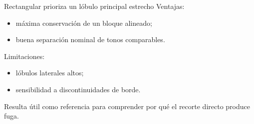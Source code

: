\documentclass[
  ignorenonframetext,
  aspectratio=169,
  spanish,
]{beamer}
\providecommand{\tightlist}{%
  \setlength{\itemsep}{0pt}\setlength{\parskip}{0pt}}
\begin{document}
\begin{frame}{Rectangular prioriza un lóbulo principal estrecho}
  \protect{}\label{rectangular-prioriza-un-luxf3bulo-principal-estrecho}
  Ventajas:

  \begin{itemize}
    \tightlist
    \item
          máxima conservación de un bloque alineado;
    \item
          buena separación nominal de tonos comparables.
  \end{itemize}

  Limitaciones:

  \begin{itemize}
    \tightlist
    \item
          lóbulos laterales altos;
    \item
          sensibilidad a discontinuidades de borde.
  \end{itemize}

  \begin{tcolorbox}[enhanced jigsaw, arc=.35mm, bottomrule=.15mm, bottomtitle=1mm, breakable, colback=white, colbacktitle=quarto-callout-note-color!10!white, colframe=quarto-callout-note-color-frame, coltitle=black, left=2mm, leftrule=.75mm, opacityback=0, opacitybacktitle=0.6, rightrule=.15mm, title=\textcolor{quarto-callout-note-color}{\faInfo}\hspace{0.5em}{Nota}, titlerule=0mm, toprule=.15mm, toptitle=1mm]

    Resulta útil como referencia para comprender por qué el recorte directo
    produce fuga.

  \end{tcolorbox}
\end{frame}
\end{document}
